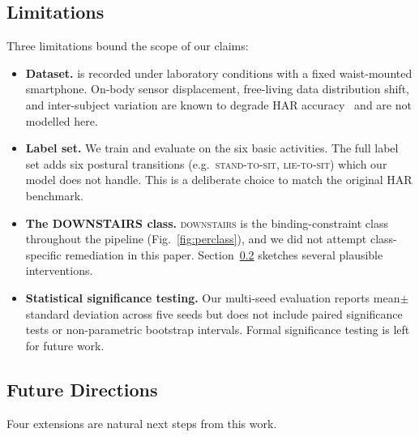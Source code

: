 \subsection{Limitations}
\label{sec:disc:limitations}

Three limitations bound the scope of our claims:

\begin{itemize}
\item \textbf{Dataset.} \hapt{} is recorded under laboratory
conditions with a fixed waist-mounted smartphone. On-body sensor
displacement, free-living data distribution shift, and
inter-subject variation are known to degrade HAR
accuracy~\cite{wang2019harsurvey,demrozi2020harsurvey} and are not
modelled here.

\item \textbf{Label set.} We train and evaluate on the six basic
\hapt{} activities. The full \hapt{} label set adds six postural
transitions (e.g.\ \textsc{stand-to-sit}, \textsc{lie-to-sit})
which our model does not handle. This is a deliberate choice
to match the original \fastgrnn{} HAR benchmark.

\item \textbf{The DOWNSTAIRS class.} \textsc{downstairs} is the
binding-constraint class throughout the pipeline
(Fig.~\ref{fig:perclass}), and we did not attempt class-specific
remediation in this paper. Section~\ref{sec:disc:future} sketches
several plausible interventions.

\item \textbf{Statistical significance testing.} Our multi-seed
evaluation reports mean$\pm$standard deviation across five seeds
but does not include paired significance tests or non-parametric
bootstrap intervals. Formal significance testing is left for
future work.
\end{itemize}

\subsection{Future Directions}
\label{sec:disc:future}

Four extensions are natural next steps from this work.

